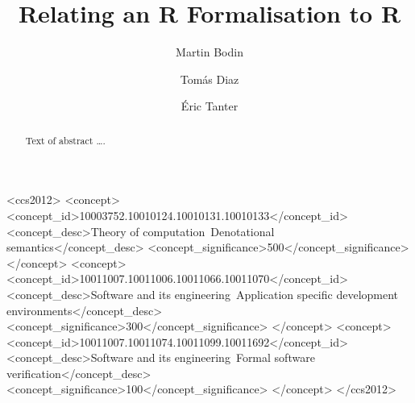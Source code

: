 \documentclass[
    sigplan,
    10pt,
    review, %
    natbib=false %
 ]{acmart}
\begin{document}
\title{Relating an R Formalisation to R} %

\author{Martin Bodin}

\author{Tomás Diaz}

\author{Éric Tanter}

\begin{abstract}
Text of abstract \ldots.
\end{abstract}

\begin{CCSXML}
  <ccs2012>
    <concept>
      <concept_id>10003752.10010124.10010131.10010133</concept_id>
      <concept_desc>Theory of computation~Denotational semantics</concept_desc>
      <concept_significance>500</concept_significance>
    </concept>
    <concept>
      <concept_id>10011007.10011006.10011066.10011070</concept_id>
      <concept_desc>Software and its engineering~Application specific development environments</concept_desc>
      <concept_significance>300</concept_significance>
    </concept>
    <concept>
      <concept_id>10011007.10011074.10011099.10011692</concept_id>
      <concept_desc>Software and its engineering~Formal software verification</concept_desc>
      <concept_significance>100</concept_significance>
    </concept>
  </ccs2012>
\end{CCSXML}

\end{document}
